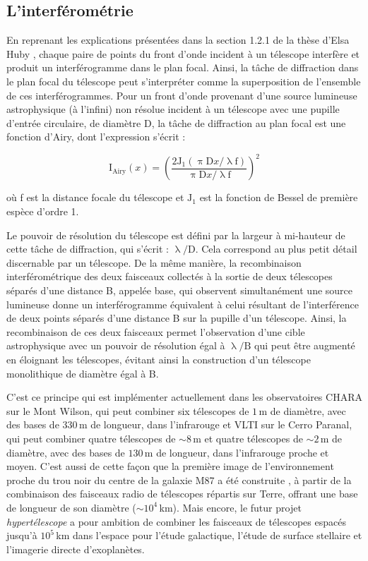 \subsection{L'interférométrie}

En reprenant les explications présentées dans la section 1.2.1 de la thèse d'Elsa Huby \citep{huby2013these}, chaque paire de points du front d'onde incident à un télescope interfère et produit un interférogramme dans le plan focal. Ainsi, la tâche de diffraction dans le plan focal du télescope peut s'interpréter comme la superposition de l'ensemble de ces interférogrammes. Pour un front d'onde provenant d'une source lumineuse astrophysique (à l'infini) non résolue incident à un télescope avec une pupille d'entrée circulaire, de diamètre D, la tâche de diffraction au plan focal est une fonction d'Airy, dont l'expression s'écrit :

\begin{equation}
    \text{I}_{\text{Airy}}(x) = \left( \frac{2 \text{J}_{1} (\uppi \text{D}x / \uplambda \text{f})}{\uppi \text{D}x / \uplambda \text{f}} \right)^2
\end{equation}

\noindent où f est la distance focale du télescope et $\text{J}_{1}$ est la fonction de Bessel de première espèce d'ordre 1.

Le pouvoir de résolution du télescope est défini par la largeur à mi-hauteur de cette tâche de diffraction, qui s'écrit : $\uplambda / \text{D}$. Cela correspond au plus petit détail discernable par un télescope. De la même manière, la recombinaison interférométrique des deux faisceaux collectés à la sortie de deux télescopes séparés d'une distance B, appelée base, qui observent simultanément une source lumineuse donne un interférogramme équivalent à celui résultant de l'interférence de deux points séparés d'une distance B sur la pupille d'un télescope. Ainsi, la recombinaison de ces deux faisceaux permet l'observation d'une cible astrophysique avec un pouvoir de résolution égal à $\uplambda / \text{B}$ qui peut être augmenté en éloignant les télescopes, évitant ainsi la construction d'un télescope monolithique de diamètre égal à B.

C'est ce principe qui est implémenter actuellement dans les observatoires \ac{CHARA} \citep{tenbrummelaar2005} sur le Mont Wilson, qui peut combiner six télescopes de $1 \,$m de diamètre, avec des bases de $330 \,$m de longueur, dans l'infrarouge et \ac{VLTI} \citep{haguenauer2012} sur le Cerro Paranal, qui peut combiner quatre télescopes de $\sim 8 \,$m et quatre télescopes de $\sim 2 \,$m de diamètre, avec des bases de $130 \,$m de longueur, dans l'infrarouge proche et moyen. C'est aussi de cette façon que la première image de l'environnement proche du trou noir du centre de la galaxie M87 a été construite \citep{EHTC2019}, à partir de la combinaison des faisceaux radio de télescopes répartis sur Terre, offrant une base de longueur de son diamètre ($\sim 10^4 \,$km). Mais encore, le futur projet \textit{hypertélescope} \citep{labeyrie2013} a pour ambition de combiner les faisceaux de télescopes espacés jusqu'à $10^5 \,$km dans l'espace pour l'étude galactique, l'étude de surface stellaire et l'imagerie directe d'exoplanètes.

